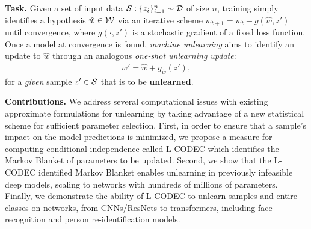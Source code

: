 \textbf{Task.} Given a set of input data $\mathcal{S}: \{z_i\}_{i=1}^n \sim \mathcal{D}$ of size $n$, training simply identifies a hypothesis $\hat{w} \in \mathcal{W}$  via an iterative scheme $w_{t+1} = w_t - g(\hat{w},z')$ until convergence, where $g(\cdot,z')$ is  a stochastic gradient of a fixed loss function. Once a model at convergence is found, \textit{machine unlearning} aims to identify an update to $\hat{w}$ through an analogous \textit{one-shot unlearning update}:
\begin{align}\label{eq:unlearn}
    w' = \hat{w} + g_{\hat{w}}\left(z'\right),
\end{align}
for a \textit{given} sample $z' \in \mathcal{S}$ that is to be \textbf{unlearned}.

\noindent\textbf{Contributions.} We address several computational issues with existing approximate formulations for unlearning by taking advantage of a new statistical scheme for sufficient parameter selection. 
First, in order to ensure that a sample's impact on the model predictions is minimized, we propose a measure for computing conditional independence called L-CODEC which  identifies the Markov Blanket of parameters to be  updated. 
Second, we show that the L-CODEC identified Markov Blanket enables unlearning in previously infeasible deep models, scaling to networks with hundreds of millions of parameters. 
Finally, we demonstrate the ability of L-CODEC to unlearn samples and entire classes on networks, from CNNs/ResNets to transformers, including face recognition and person re-identification models.